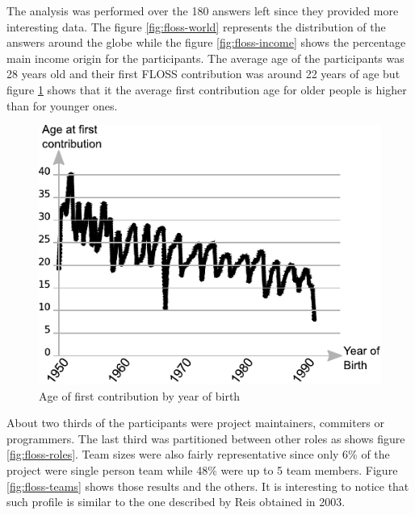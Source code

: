 \documentclass[lnbip]{svmultln}
\begin{document}
The analysis was performed over the 180 answers left since they
provided more interesting data. The figure \ref{fig:floss-world}
represents the distribution of the answers around the globe while the
figure \ref{fig:floss-income} shows the percentage main income origin
for the participants. The average age of the participants was 28 years
old and their first FLOSS contribution was around 22 years of age but
figure \ref{fig:floss-firstxp} shows that it the average first
contribution age for older people is higher than for younger ones.

\begin{figure}[htb]
  \centering
  \includegraphics{floss-firstxp.pdf}
  \caption{Age of first contribution by year of birth}
  \label{fig:floss-firstxp}
\end{figure}

About two thirds of the participants were project maintainers,
commiters or programmers. The last third was partitioned between other
roles as shows figure \ref{fig:floss-roles}. Team sizes were also
fairly representative since only 6\% of the project were single person
team while 48\% were up to 5 team members. Figure
\ref{fig:floss-teams} shows those results and the others. It is
interesting to notice that such profile is similar to the one
described by Reis \cite{reis2003} obtained in 2003.
\end{document}
